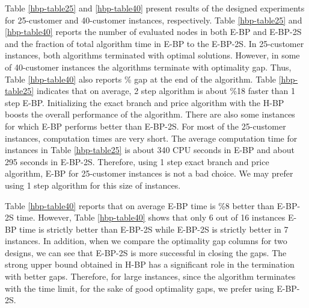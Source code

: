 Table \ref{hbp-table25} and \ref{hbp-table40} present results of the
designed experiments for 25-customer and 40-customer instances, respectively.
Table \ref{hbp-table25} and \ref{hbp-table40} reports the number of evaluated
nodes in both E-BP and E-BP-2S and the fraction of total algorithm time
in E-BP to the E-BP-2S. In 25-customer instances, both algorithms
terminated with optimal solutions. However, in some of 40-customer instances
the algorithms terminate with optimality gap. Thus, Table \ref{hbp-table40}
also reports \% gap at the end of the algorithm. Table \ref{hbp-table25}
indicates that on average, 2 step algorithm is about \%18 faster than 1 step E-BP.
Initializing the exact branch and price algorithm with the H-BP
boosts the overall performance of the algorithm. There are also some instances
for which E-BP performs better than E-BP-2S. For most of the 25-customer
instances, computation times are very short. The average computation time
for instances in  Table \ref{hbp-table25} is about 340 CPU seconds
in E-BP and about 295 seconds in E-BP-2S. Therefore, using 1 step exact branch
and price algorithm, E-BP for 25-customer instances is not a bad
choice. We may prefer using 1 step algorithm for this size of instances.

Table \ref{hbp-table40} reports that on average E-BP time is \%8 better than
E-BP-2S time. However, Table \ref{hbp-table40} shows that only 6 out of 16 instances
E-BP time is strictly better than E-BP-2S while E-BP-2S is strictly better
in 7 instances. In addition, when we compare the optimality gap columns for
two designs, we can see that E-BP-2S is more successful in closing the gaps.
The strong upper bound obtained in H-BP has a significant role in the termination
with better gaps. Therefore, for large instances, since the algorithm
terminates with the time limit, for the sake of good optimality gaps, we prefer
using E-BP-2S.

